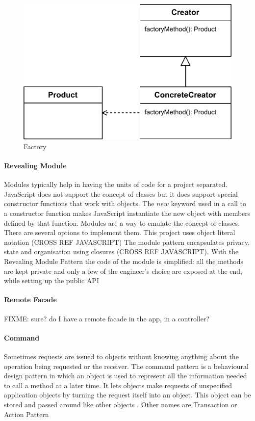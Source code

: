 \begin{figure}[htb]
    \centering
    \includegraphics{figures/design-patterns-factory.pdf}
    \caption{Factory}
    \label{fig:factory}
\end{figure}


\paragraph{Revealing Module} \cite{Osmani:2012} Modules typically help in having the units of code for a project separated.
JavaScript does not support the concept of classes but it does support special constructor functions that work with objects. 
The $new$ keyword used in a call to a constructor function makes JavaScript instantiate the new object with members defined by that function.
Modules are a way to emulate the concept of classes.
There are several options to implement them. 
This project uses object literal notation (CROSS REF JAVASCRIPT)
The module pattern encapsulates privacy, state and organisation using closures (CROSS REF JAVASCRIPT).
With the Revealing Module Pattern the code of the module is simplified: all the methods are kept private and only a few of the engineer's choice are exposed at the end, while setting up the public \ac{API}

\paragraph{Remote Facade} FIXME: sure? do I have a remote facade in the app, in a controller?

\paragraph{Command} 
Sometimes requests are issued to objects without knowing anything about the operation being requested or the receiver.
The command pattern is a behavioural design pattern in which an object is used to represent all the information needed to call a method at a later time. 
It lets objects make requests of unspecified application objects by turning the request itself into an object.
This object can be stored and passed around like other objects \cite{GoF:1995}.
Other names are Transaction or Action Pattern  

